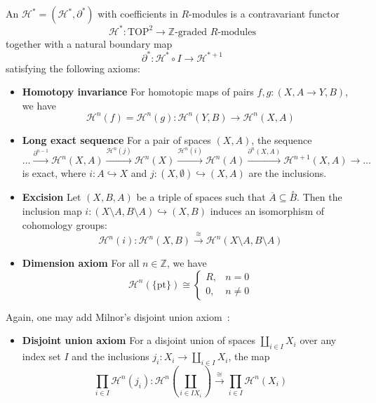 \documentclass[a4paper,11pt]{article}
\begin{document}
\begin{definition}
    An  \(\mathcal{H}^\ast=(\mathcal{H}^\ast,\partial^\ast)\) with coefficients in \(R\)-modules is a contravariant functor \[\mathcal{H}^\ast:\mathrm{TOP}^2\to\mathbb{Z}\text{-graded }R\text{-modules}\] together with a natural boundary map
    \[\partial^\ast:\mathcal{H}^\ast\circ I\to\mathcal{H}^{\ast+1}\] satisfying the following axioms:
    \begin{itemize}
        \item \textbf{Homotopy invariance} For homotopic maps of pairs \(f,g:(X,A\to Y,B)\), we have \[\mathcal{H}^n(f)=\mathcal{H}^n(g):\mathcal{H}^n(Y,B)\to\mathcal{H}^n(X,A)\]
        \item \textbf{Long exact sequence} For a pair of spaces \((X,A)\), the sequence \[\dots\xrightarrow{\partial^{n-1}}\mathcal{H}^n(X,A)\xrightarrow{\mathcal{H}^n(j)}\mathcal{H}^n(X)\xrightarrow{\mathcal{H}^n(i)}\mathcal{H}^n(A)\xrightarrow{\partial^n(X,A)}\mathcal{H}^{n+1}(X,A)\rightarrow\dots\] is exact, where \(i:A\hookrightarrow X\) and \(j:(X,\emptyset)\hookrightarrow (X,A)\) are the inclusions.
        \item \textbf{Excision} Let \((X,B,A)\) be a triple of spaces such that \(\overline{A}\subseteq\overset{\circ}{B}\). Then the inclusion map \(i:(X\setminus A,B\setminus A)\hookrightarrow(X,B)\) induces an isomorphism of cohomology groups: \[\mathcal{H}^n(i):\mathcal{H}^n(X,B)\xrightarrow{\cong}\mathcal{H}^n(X\setminus A, B\setminus A)\]
        \item \textbf{Dimension axiom}
        For all \(n\in\mathbb{Z}\), we have \[\mathcal{H}^n(\{\mathrm{pt}\})\cong\begin{cases} R, & n=0\\ 0, & n\neq0\end{cases}\]
    \end{itemize}
    Again, one may add Milnor's disjoint union axiom\ \cite[p.337,Additivity Axiom]{milnor}:
    \begin{itemize}
        \item \textbf{Disjoint union axiom}
        For a disjoint union of spaces \(\coprod_{i\in I}X_i\) over any index set \(I\) and the inclusions \(j_i:X_i\to\coprod_{i\in I}X_i\), the map
        \[\prod_{i\in I}\mathcal{H}^n(j_i):\mathcal{H}^n\left(\coprod_{i\in I X_i}\right)\xrightarrow{\cong}\prod_{i\in I}\mathcal{H}^n(X_i)\]
    \end{itemize}
\end{definition}
\end{document}
